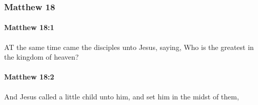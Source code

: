 	\subsubsection{Matthew 18} %
		\label{MATTHEW-18}
		
		\paragraph{Matthew 18:1} %
			\label{MATTHEW-18-1}

			AT the same time came the disciples unto Jesus, saying, Who is the greatest in the kingdom of heaven?

			\begin{framed}
			\scriptsize
				\begin{compactdesc}
					\item[SBLG] 
				\end{compactdesc}
			\end{framed}

		\paragraph{Matthew 18:2} %
			\label{MATTHEW-18-2}

			And Jesus called a little child unto him, and set him in the midst of them,

